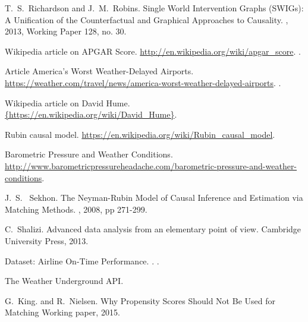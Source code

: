 \begin{thebibliography}{10}
T.~S.~Richardson and J.~M.~Robins.
\newblock Single World Intervention Graphs (SWIGs): A Unification of the Counterfactual and Graphical Approaches to Causality.
, 2013,  Working Paper 128, no. 30.




{Wikipedia article on APGAR Score}.
\newblock \mbox{\url{http://en.wikipedia.org/wiki/apgar_score}}.
.

{Article America's Worst Weather-Delayed Airports}.
\newblock \mbox{\url{ https://weather.com/travel/news/america-worst-weather-delayed-airports}}.
.


{Wikipedia article on David Hume}.
\newblock \url{{https://en.wikipedia.org/wiki/David_Hume}}.

Rubin causal model.
\newblock \url{https://en.wikipedia.org/wiki/Rubin_causal_model}.

Barometric Pressure and Weather Conditions.
\newblock \url{http://www.barometricpressureheadache.com/barometric-pressure-and-weather-conditions}.


J.~S.~ Sekhon.
\newblock The Neyman-Rubin Model of Causal Inference and Estimation via Matching Methods.
, 2008,  pp 271-299.


C.~Shalizi.
\newblock Advanced data analysis from an elementary point of view.
\newblock Cambridge University Press, 2013.


{Dataset: Airline On-Time Performance}.
.
.

The Weather Underground API.

G.~King. and R.~Nielsen.
\newblock Why Propensity Scores Should Not Be Used for Matching
\newblock Working paper, 2015.


\end{thebibliography} 